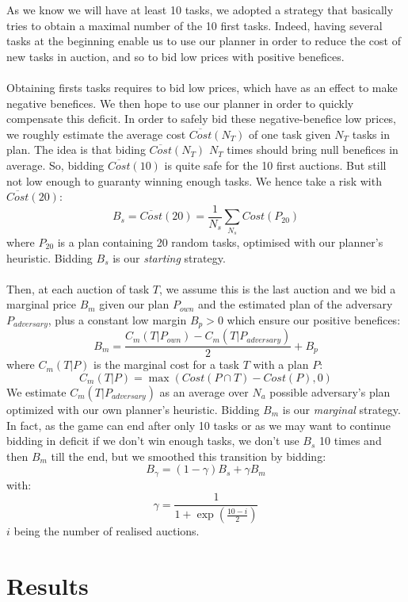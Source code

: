 \documentclass[11pt]{article}
\begin{document}
As we know we will have at least 10 tasks, we adopted a strategy that basically tries to obtain a maximal number of the 10 first tasks. Indeed, having several tasks at the beginning enable us to use our planner in order to reduce the cost of new tasks in auction, and so to bid low prices with positive benefices.\\
\\
Obtaining firsts tasks requires to bid low prices, which have as an effect to make negative benefices. We then hope to use our planner in order to quickly compensate this deficit. In order to safely bid these negative-benefice low prices, we roughly estimate the average cost $\overline{\textit{Cost}}(N_T)$ of one task given $N_T$ tasks in plan. The idea is that biding $\overline{\textit{Cost}}(N_T)$ $N_T$ times should bring null benefices in average. So, bidding $\overline{\textit{Cost}}(10)$ is quite safe for the 10 first auctions. But still not low enough to guaranty winning enough tasks. We hence take a risk with $\overline{\textit{Cost}}(20)$:
\[B_s = \overline{\textit{Cost}}(20) = \frac{1}{N_s}\sum\limits_{N_s}\textit{Cost}(P_{20})\]
where $P_{20}$ is a plan containing 20 random tasks, optimised with our planner's heuristic. Bidding $B_s$ is our \textit{starting} strategy.\\
\\
Then, at each auction of task $T$, we assume this is the last auction and we bid a marginal price $B_m$ given our plan $P_\textit{own}$ and the estimated plan of the adversary $P_\textit{adversary}$, plus a constant low margin $B_p>0$ which ensure our positive benefices:
\[B_\textit{m} = \frac{C_m(T\vert P_\textit{own}) - C_m(T\vert P_\textit{adversary})}{2} + B_p\]
where $C_m(T\vert P)$ is the marginal cost for a task $T$ with a plan $P$:
\[C_m(T\vert P) = \max(\textit{Cost}(P\cap T) - \textit{Cost}(P), 0)\]
We estimate $C_m(T\vert P_\textit{adversary})$ as an average over $N_a$ possible adversary's plan optimized with our own planner's heuristic. Bidding $B_m$ is our \textit{marginal} strategy. In fact, as the game can end after only 10 tasks or as we may want to continue bidding in deficit if we don't win enough tasks, we don't use $B_s$ 10 times and then $B_m$ till the end, but we smoothed this transition by bidding:
\[B_\gamma = (1-\gamma)B_s + \gamma B_m\]
with: 
\[\gamma = \frac{1}{1+\exp(\frac{10-i}{2})}\]
$i$ being the number of realised auctions. 

\section{Results}
\end{document}
